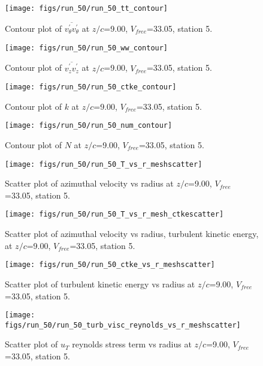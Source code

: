 \begin{figure}[H]
\centering
\texttt{[image: figs/run\_50/run\_50\_tt\_contour]}
\caption{Contour plot of $\overline{v_{\theta}^{\prime} v_{\theta}^{\prime}}$ at $z/c$=9.00, $V_{free}$=33.05, station 5.}
\end{figure}


\begin{figure}[H]
\centering
\texttt{[image: figs/run\_50/run\_50\_ww\_contour]}
\caption{Contour plot of $\overline{v_{z}^{\prime} v_{z}^{\prime}}$ at $z/c$=9.00, $V_{free}$=33.05, station 5.}
\end{figure}


\begin{figure}[H]
\centering
\texttt{[image: figs/run\_50/run\_50\_ctke\_contour]}
\caption{Contour plot of $k$ at $z/c$=9.00, $V_{free}$=33.05, station 5.}
\end{figure}


\begin{figure}[H]
\centering
\texttt{[image: figs/run\_50/run\_50\_num\_contour]}
\caption{Contour plot of $N$ at $z/c$=9.00, $V_{free}$=33.05, station 5.}
\end{figure}


\begin{figure}[H]
\centering
\texttt{[image: figs/run\_50/run\_50\_T\_vs\_r\_meshscatter]}
\caption{Scatter plot of azimuthal velocity vs radius at $z/c$=9.00, $V_{free}$=33.05, station 5.}
\end{figure}


\begin{figure}[H]
\centering
\texttt{[image: figs/run\_50/run\_50\_T\_vs\_r\_mesh\_ctkescatter]}
\caption{Scatter plot of azimuthal velocity vs radius, turbulent kinetic energy, at $z/c$=9.00, $V_{free}$=33.05, station 5.}
\end{figure}


\begin{figure}[H]
\centering
\texttt{[image: figs/run\_50/run\_50\_ctke\_vs\_r\_meshscatter]}
\caption{Scatter plot of turbulent kinetic energy vs radius at $z/c$=9.00, $V_{free}$=33.05, station 5.}
\end{figure}


\begin{figure}[H]
\centering
\texttt{[image: figs/run\_50/run\_50\_turb\_visc\_reynolds\_vs\_r\_meshscatter]}
\caption{Scatter plot of $
u_T$ reynolds stress term vs radius at $z/c$=9.00, $V_{free}$=33.05, station 5.}
\end{figure}


